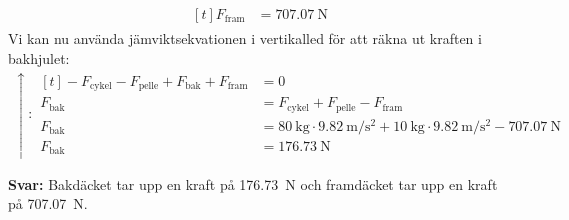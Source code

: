 \documentclass[11pt]{article}
\begin{document}
\begin{enumerate}[itemsep=2em]
\begin{align*}
\begin{aligned}[t]
                                                             F_{\text{fram}}                                                                                                                                                                                                   & = \SI{707.07}{\newton}
                                                     \end{aligned}
              \end{align*}
              Vi kan nu använda jämviktsekvationen i vertikalled för att räkna ut kraften i bakhjulet:
              \begin{align*}
                      \uparrow : \begin{aligned}[t]
                                         - F_{\text{cykel}} - F_{\text{pelle}} + F_{\text{bak}} + F_{\text{fram}} & = 0                                                                                                                                                \\
                                         F_{\text{bak}}                                                           & = F_{\text{cykel}} + F_{\text{pelle}} - F_{\text{fram}}                                                                                            \\
                                         F_{\text{bak}}                                                           & = \SI{80}{\kilo\gram} \cdot \SI{9.82}{\meter/\second\squared} + \SI{10}{\kilo\gram} \cdot \SI{9.82}{\meter/\second\squared} - \SI{707.07}{\newton} \\
                                         F_{\text{bak}}                                                           & = \SI{176.73}{\newton}
                                 \end{aligned}
              \end{align*}

              \textbf{Svar: } Bakdäcket tar upp en kraft på \SI{176.73}{\newton} och framdäcket tar upp en kraft på \SI{707.07}{\newton}.


\end{enumerate}
\end{document}
